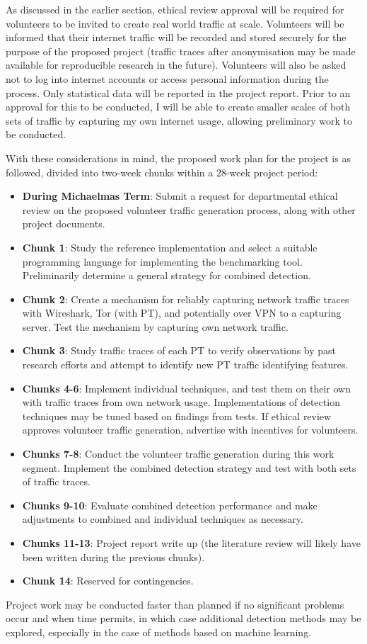 \documentclass[11pt]{article}
\begin{document}
As discussed in the earlier section, ethical review approval will be required for volunteers to be invited to create real world traffic at scale. Volunteers will be informed that their internet traffic will be recorded and stored securely for the purpose of the proposed project (traffic traces after anonymisation may be made available for reproducible research in the future). Volunteers will also be asked not to log into internet accounts or access personal information during the process. Only statistical data will be reported in the project report. Prior to an approval for this to be conducted, I will be able to create smaller scales of both sets of traffic by capturing my own internet usage, allowing preliminary work to be conducted. 

With these considerations in mind, the proposed work plan for the project is as followed, divided into two-week chunks within a 28-week project period:

\begin{itemize}
	\item \textbf{During Michaelmas Term}: Submit a request for departmental ethical review on the proposed volunteer traffic generation process, along with other project documents.
	\item \textbf{Chunk 1}: Study the reference implementation and select a suitable programming language for implementing the benchmarking tool. Preliminarily determine a general strategy for combined detection.
	\item \textbf{Chunk 2}: Create a mechanism for reliably capturing network traffic traces with Wireshark, Tor (with PT), and potentially over VPN to a capturing server. Test the mechanism by capturing own network traffic.
	\item \textbf{Chunk 3}: Study traffic traces of each PT to verify observations by past research efforts and attempt to identify new PT traffic identifying features.
	\item \textbf{Chunks 4-6}: Implement individual techniques, and test them on their own with traffic traces from own network usage. Implementations of detection techniques may be tuned based on findings from tests.  If ethical review approves volunteer traffic generation, advertise with incentives for volunteers.
	\item \textbf{Chunks 7-8}: Conduct the volunteer traffic generation during this work segment. Implement the combined detection strategy and test with both sets of traffic traces. 
	\item \textbf{Chunks 9-10}: Evaluate combined detection performance and make adjustments to combined and individual techniques as necessary.
	\item \textbf{Chunks 11-13}: Project report write up (the literature review will likely have been written during the previous chunks).
	\item \textbf{Chunk 14}: Reserved for contingencies.
\end{itemize}

Project work may be conducted faster than planned if no significant problems occur and when time permits, in which case additional detection methods may be explored, especially in the case of methods based on machine learning.


\footnotesize{}
\end{document}
